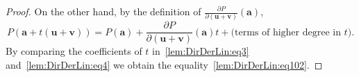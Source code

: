 \documentclass{elsarticle}
\theoremstyle{definition}
\numberwithin{equation}{section}
\begin{document}
\begin{proof}
On the other hand, by the definition of $\frac{\partial P}{\partial (\mathbf u + \mathbf v)}(\mathbf a)$,
\begin{equation}\label{lem:DirDerLin:eq4}
P(\mathbf a +  t (\mathbf u + \mathbf v)) 
= P(\mathbf a)  + \frac{\partial P}{\partial (\mathbf u + \mathbf v)}(\mathbf a)t + \mbox{(terms of higher degree in $t$)}.
\end{equation}
%
By comparing the coefficients of $t$ in~\eqref{lem:DirDerLin:eq3} and~\eqref{lem:DirDerLin:eq4} we obtain the equality~\eqref{lem:DirDerLin:eq102}.
%
\end{proof}
\end{document}
